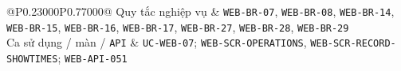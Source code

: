 \begin{longtable}{@{}P{0.23000\SRSWidth}P{0.77000\SRSWidth}@{}}
Quy tắc nghiệp vụ & \texttt{WEB-\allowbreak{}BR-\allowbreak{}07}, \texttt{WEB-\allowbreak{}BR-\allowbreak{}08}, \texttt{WEB-\allowbreak{}BR-\allowbreak{}14}, \texttt{WEB-\allowbreak{}BR-\allowbreak{}15}, \texttt{WEB-\allowbreak{}BR-\allowbreak{}16}, \texttt{WEB-\allowbreak{}BR-\allowbreak{}17}, \texttt{WEB-\allowbreak{}BR-\allowbreak{}27}, \texttt{WEB-\allowbreak{}BR-\allowbreak{}28}, \texttt{WEB-\allowbreak{}BR-\allowbreak{}29} \\[3pt]
Ca sử dụng /\allowbreak{} màn /\allowbreak{} \texttt{API} & \texttt{UC-\allowbreak{}WEB-\allowbreak{}07}; \texttt{WEB-\allowbreak{}SCR-\allowbreak{}OPERATIO\allowbreak{}NS}, \texttt{WEB-\allowbreak{}SCR-\allowbreak{}RECORD-\allowbreak{}SHOWTIME\allowbreak{}S}; \texttt{WEB-\allowbreak{}API-\allowbreak{}051} \\[3pt]
\end{longtable}
\endgroup

